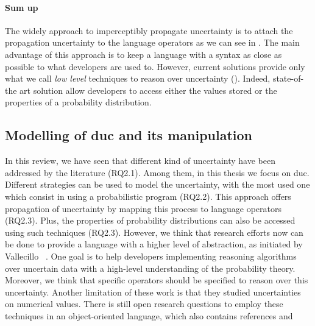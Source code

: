\paragraph{Sum up}
The widely approach to imperceptibly propagate uncertainty is to attach the propagation uncertainty to the language operators as we can see in .
The main advantage of this approach is to keep a language with a syntax as close as possible to what developers are used to.
However, current solutions provide only what we call \textit{low level} techniques to reason over uncertainty (\cf {}).
Indeed, state-of-the art solution allow developers to access either the values stored or the properties of a probability distribution.

\subsection[Modelling of data uncertainty and its manipulation]{Modelling of \gls{duc} and its manipulation}

In this review, we have seen that different kind of uncertainty have been addressed by the literature (RQ2.1).
Among them, in this thesis we focus on \gls{duc}.
Different strategies can be used to model the uncertainty, with the most used one which consist in using a probabilistic program (RQ2.2).
This approach offers propagation of uncertainty by mapping this process to language operators (RQ2.3).
Plus, the properties of probability distributions can also be accessed using such techniques  (RQ2.3).
However, we think that research efforts now can be done to provide a language with a higher level of abstraction, as initiated by Vallecillo \etal~\cite{DBLP:conf/quatic/VallecilloMO16}.
One goal is to help developers implementing reasoning algorithms over uncertain data with a high-level understanding of the probability theory.
Moreover, we think that specific operators should be specified to reason over this uncertainty.
Another limitation of these work is that they studied uncertainties on numerical values.
There is still open research questions to employ these techniques in an object-oriented language, which also contains references and  



















